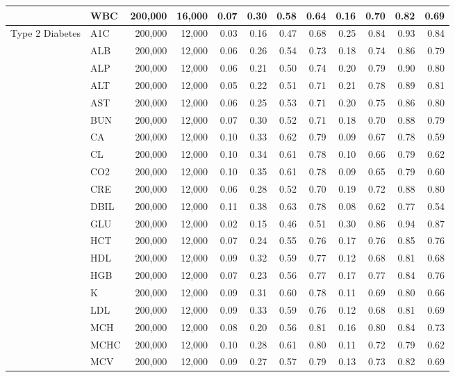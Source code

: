 \begin{table}[ht]
\begin{tabular}{llrrrrrrrrrr}
 & WBC & 200,000 & 16,000 & 0.07 & 0.30 & 0.58 & 0.64 & 0.16 & 0.70 & 0.82 & 0.69 \\
\midrule
Type 2 Diabetes & A1C & 200,000 & 12,000 & 0.03 & 0.16 & 0.47 & 0.68 & 0.25 & 0.84 & 0.93 & 0.84 \\
 & ALB & 200,000 & 12,000 & 0.06 & 0.26 & 0.54 & 0.73 & 0.18 & 0.74 & 0.86 & 0.79 \\
 & ALP & 200,000 & 12,000 & 0.06 & 0.21 & 0.50 & 0.74 & 0.20 & 0.79 & 0.90 & 0.80 \\
 & ALT & 200,000 & 12,000 & 0.05 & 0.22 & 0.51 & 0.71 & 0.21 & 0.78 & 0.89 & 0.81 \\
 & AST & 200,000 & 12,000 & 0.06 & 0.25 & 0.53 & 0.71 & 0.20 & 0.75 & 0.86 & 0.80 \\
 & BUN & 200,000 & 12,000 & 0.07 & 0.30 & 0.52 & 0.71 & 0.18 & 0.70 & 0.88 & 0.79 \\
 & CA & 200,000 & 12,000 & 0.10 & 0.33 & 0.62 & 0.79 & 0.09 & 0.67 & 0.78 & 0.59 \\
 & CL & 200,000 & 12,000 & 0.10 & 0.34 & 0.61 & 0.78 & 0.10 & 0.66 & 0.79 & 0.62 \\
 & CO2 & 200,000 & 12,000 & 0.10 & 0.35 & 0.61 & 0.78 & 0.09 & 0.65 & 0.79 & 0.60 \\
 & CRE & 200,000 & 12,000 & 0.06 & 0.28 & 0.52 & 0.70 & 0.19 & 0.72 & 0.88 & 0.80 \\
 & DBIL & 200,000 & 12,000 & 0.11 & 0.38 & 0.63 & 0.78 & 0.08 & 0.62 & 0.77 & 0.54 \\
 & GLU & 200,000 & 12,000 & 0.02 & 0.15 & 0.46 & 0.51 & 0.30 & 0.86 & 0.94 & 0.87 \\
 & HCT & 200,000 & 12,000 & 0.07 & 0.24 & 0.55 & 0.76 & 0.17 & 0.76 & 0.85 & 0.76 \\
 & HDL & 200,000 & 12,000 & 0.09 & 0.32 & 0.59 & 0.77 & 0.12 & 0.68 & 0.81 & 0.68 \\
 & HGB & 200,000 & 12,000 & 0.07 & 0.23 & 0.56 & 0.77 & 0.17 & 0.77 & 0.84 & 0.76 \\
 & K & 200,000 & 12,000 & 0.09 & 0.31 & 0.60 & 0.78 & 0.11 & 0.69 & 0.80 & 0.66 \\
 & LDL & 200,000 & 12,000 & 0.09 & 0.33 & 0.59 & 0.76 & 0.12 & 0.68 & 0.81 & 0.69 \\
 & MCH & 200,000 & 12,000 & 0.08 & 0.20 & 0.56 & 0.81 & 0.16 & 0.80 & 0.84 & 0.73 \\
 & MCHC & 200,000 & 12,000 & 0.10 & 0.28 & 0.61 & 0.80 & 0.11 & 0.72 & 0.79 & 0.62 \\
 & MCV & 200,000 & 12,000 & 0.09 & 0.27 & 0.57 & 0.79 & 0.13 & 0.73 & 0.82 & 0.69 \\

\end{tabular}
\end{table}
